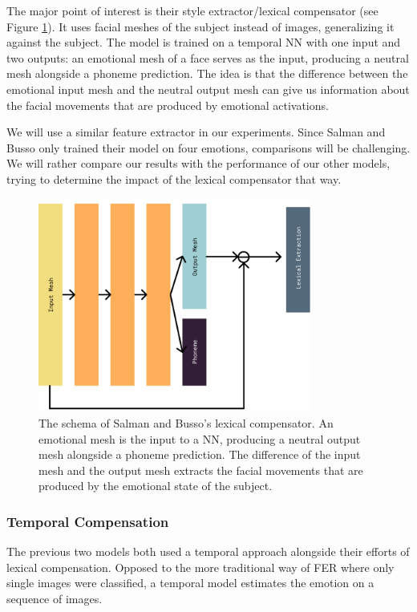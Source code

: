 The major point of interest is their style extractor/lexical compensator (see Figure \ref{fig:bussose}). It uses facial meshes of the subject instead of images, generalizing it against the subject. The model is trained on a temporal NN with one input and two outputs: an emotional mesh of a face serves as the input, producing a neutral mesh alongside a phoneme prediction. The idea is that the difference between the emotional input mesh and the neutral output mesh can give us information about the facial movements that are produced by emotional activations.

We will use a similar feature extractor in our experiments. Since Salman and Busso only trained their model on four emotions, comparisons will be challenging. We will rather compare our results with the performance of our other models, trying to determine the impact of the lexical compensator that way. 

\begin{figure}
    \centering
    \includegraphics[width=0.8\textwidth]{res/png_backup/styleexbusso.png}
    \caption{The schema of Salman and Busso's lexical compensator. An emotional mesh is the input to a NN, producing a neutral output mesh alongside a phoneme prediction. The difference of the input mesh and the output mesh extracts the facial movements that are produced by the emotional state of the subject.}
    \label{fig:bussose}
\end{figure}

\subsubsection{Temporal Compensation}
The previous two models both used a temporal approach alongside their efforts of lexical compensation. Opposed to the more traditional way of FER where only single images were classified, a temporal model estimates the emotion on a sequence of images. 


